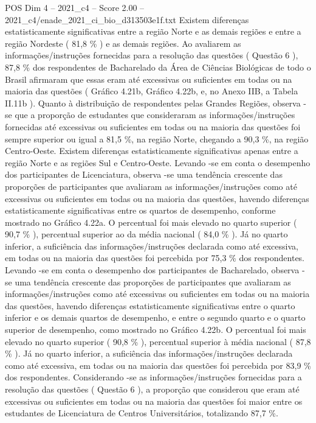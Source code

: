 \begin{textsample}{POS Dim 4 – 2021\_c4 – Score 2.00 – 2021\_c4/enade\_2021\_ci\_bio\_d313503e1f.txt}
Existem diferenças estatisticamente significativas entre a região Norte e as demais regiões e entre a região Nordeste ( 81,8 \% ) e as demais regiões.
Ao avaliarem as informações/instruções fornecidas para a resolução das questões ( Questão 6 ), 87,8 \% dos respondentes de Bacharelado da Área de Ciências Biológicas de todo o Brasil afirmaram que essas eram até excessivas ou suficientes em todas ou na maioria das questões ( Gráfico 4.21b, Gráfico 4.22b, e, no Anexo IIB, a Tabela II.11b ).
Quanto à distribuição de respondentes pelas Grandes Regiões, observa -se que a proporção de estudantes que consideraram as informações/instruções fornecidas até excessivas ou suficientes em todas ou na maioria das questões foi sempre superior ou igual a 81,5 \%, na região Norte, chegando a 90,3 \%, na região Centro-Oeste.
Existem diferenças estatisticamente significativas apenas entre a região Norte e as regiões Sul e Centro-Oeste.
Levando -se em conta o desempenho dos participantes de Licenciatura, observa -se uma tendência crescente das proporções de participantes que avaliaram as informações/instruções como até excessivas ou suficientes em todas ou na maioria das questões, havendo diferenças estatisticamente significativas entre os quartos de desempenho, conforme mostrado no Gráfico 4.22a.
O percentual foi mais elevado no quarto superior ( 90,7 \% ), percentual superior ao da média nacional ( 84,0 \% ).
Já no quarto inferior, a suficiência das informações/instruções declarada como até excessiva, em todas ou na maioria das questões foi percebida por 75,3 \% dos respondentes.
Levando -se em conta o desempenho dos participantes de Bacharelado, observa -se uma tendência crescente das proporções de participantes que avaliaram as informações/instruções como até excessivas ou suficientes em todas ou na maioria das questões, havendo diferenças estatisticamente significativas entre o quarto inferior e os demais quartos de desempenho, e entre o segundo quarto e o quarto superior de desempenho, como mostrado no Gráfico 4.22b.
O percentual foi mais elevado no quarto superior ( 90,8 \% ), percentual superior à média nacional ( 87,8 \% ).
Já no quarto inferior, a suficiência das informações/instruções declarada como até excessiva, em todas ou na maioria das questões foi percebida por 83,9 \% dos respondentes.
Considerando -se as informações/instruções fornecidas para a resolução das questões ( Questão 6 ), a proporção que considerou que eram até excessivas ou suficientes em todas ou na maioria das questões foi maior entre os estudantes de Licenciatura de Centros Universitários, totalizando 87,7 \%.

\end{textsample}
